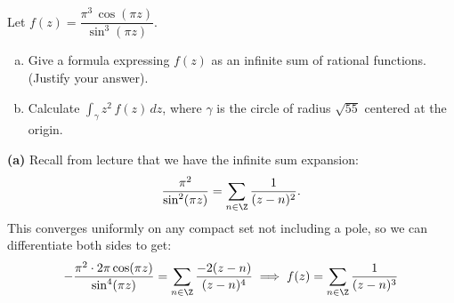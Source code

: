 \documentclass[11pt,letterpaper]{article}
\begin{document}
\begin{problem}
    Let $f(z)=\dfrac{\pi^3\,\cos(\pi z)}{\sin^3(\pi z)}$.
    \begin{enumerate}[(a)]
        \item Give a formula expressing $f(z)$ as an infinite sum of rational functions. (Justify your answer).
        \item Calculate $\displaystyle \int_\gamma z^2\,f(z)\,dz$, where $\gamma$ is the circle of radius $\sqrt{55}$ centered at the origin.
    \end{enumerate}
\end{problem}

\begin{solution}
    \textbf{(a)} Recall from lecture that we have the infinite sum expansion:
    \[
        \frac{\pi^2}{\sin^2(\pi z)} = \sum_{n\in \Z}\frac{1}{(z-n)^2}.
    \] 
    This converges uniformly on any compact set not including a pole, so we can differentiate both sides to get: 
    \[\begin{aligned}
        -\frac{\pi^2\cdot 2\pi \cos(\pi z)}{\sin^4(\pi z)}=\sum_{n\in \Z}\frac{-2(z-n)}{(z-n)^4}\implies f(z)=\sum_{n\in \Z}\frac{1}{(z-n)^3}
    \end{aligned}\]


\end{solution}
\end{document}
